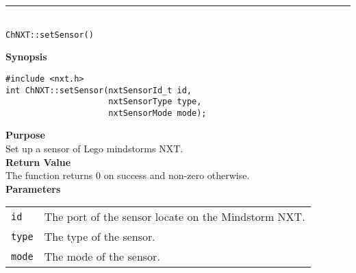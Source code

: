 \noindent
\vspace{5pt}
\rule{4.5in}{0.015in}\\
\noindent
{\LARGE \texttt{ChNXT::setSensor()} }\\


\noindent
{\bf Synopsis}
\vspace{-8pt}
\begin{verbatim}
#include <nxt.h>
int ChNXT::setSensor(nxtSensorId_t id,
                     nxtSensorType type, 
                     nxtSensorMode mode);
\end{verbatim}

\noindent
{\bf Purpose}\\
Set up a sensor of Lego mindstorms NXT.\\

\noindent
{\bf Return Value}\\
The function returns 0 on success and non-zero otherwise.\\

\noindent
{\bf Parameters}\\
\vspace{-0.1in}
\begin{description}
\item
\begin{tabular}{ p{20mm}p{135mm} }
\texttt{id}&The port of the sensor locate on the Mindstorm NXT.\\
\texttt{type}   &The type of the sensor. \\
\texttt{mode}   &The mode of the sensor. \\
\end{tabular}
\end{description}

